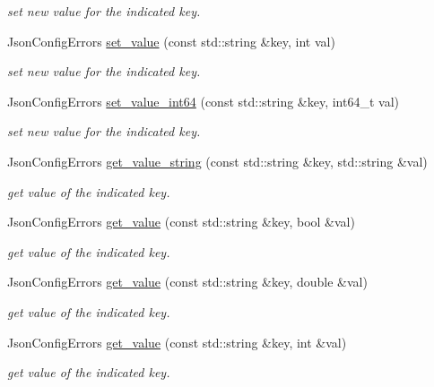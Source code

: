 \begin{DoxyCompactItemize}
\begin{DoxyCompactList}\small\item\em set new value for the indicated key. \end{DoxyCompactList}\item 
Json\-Config\-Errors \hyperlink{classJsonConfig_a5425e269b4c7f21196f8236171d429d8}{set\-\_\-value} (const std\-::string \&key, int val)
\begin{DoxyCompactList}\small\item\em set new value for the indicated key. \end{DoxyCompactList}\item 
Json\-Config\-Errors \hyperlink{classJsonConfig_a3d485ef4ff3120be09454421291c879e}{set\-\_\-value\-\_\-int64} (const std\-::string \&key, int64\-\_\-t val)
\begin{DoxyCompactList}\small\item\em set new value for the indicated key. \end{DoxyCompactList}\item 
Json\-Config\-Errors \hyperlink{classJsonConfig_afbafe98c00f500f52a53465cef93d9db}{get\-\_\-value\-\_\-string} (const std\-::string \&key, std\-::string \&val)
\begin{DoxyCompactList}\small\item\em get value of the indicated key. \end{DoxyCompactList}\item 
Json\-Config\-Errors \hyperlink{classJsonConfig_a800f597545aa7a158f19699199e8b9a4}{get\-\_\-value} (const std\-::string \&key, bool \&val)
\begin{DoxyCompactList}\small\item\em get value of the indicated key. \end{DoxyCompactList}\item 
Json\-Config\-Errors \hyperlink{classJsonConfig_ab110a5db1db673f7c98686283bd1a23f}{get\-\_\-value} (const std\-::string \&key, double \&val)
\begin{DoxyCompactList}\small\item\em get value of the indicated key. \end{DoxyCompactList}\item 
Json\-Config\-Errors \hyperlink{classJsonConfig_a11e45465452e3ad7e7114b889ed37d60}{get\-\_\-value} (const std\-::string \&key, int \&val)
\begin{DoxyCompactList}\small\item\em get value of the indicated key. \end{DoxyCompactList}\item 

\end{DoxyCompactItemize}
